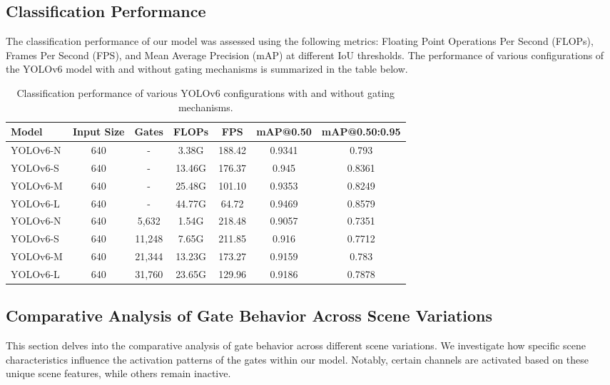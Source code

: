 \documentclass[runningheads]{llncs}
\begin{document}
\subsection{Classification Performance}
The classification performance of our model was assessed using the following metrics: Floating Point Operations Per Second (FLOPs), Frames Per Second (FPS), and Mean Average Precision (mAP) at different IoU thresholds. The performance of various configurations of the YOLOv6 model with and without gating mechanisms is summarized in the table below.

\begin{table}[ht]
\centering
\begin{tabular}{lcccccc}
\hline
\textbf{Model} & \textbf{Input Size} & \textbf{Gates} & \textbf{FLOPs} & \textbf{FPS} & \textbf{mAP@0.50} & \textbf{mAP@0.50:0.95} \\
\hline
YOLOv6-N & 640 & - & 3.38G & 188.42 & 0.9341 & 0.793 \\
YOLOv6-S & 640 & - & 13.46G & 176.37 & 0.945 & 0.8361 \\
YOLOv6-M & 640 & - & 25.48G & 101.10 & 0.9353 & 0.8249 \\
YOLOv6-L & 640 & - & 44.77G & 64.72 & 0.9469 & 0.8579 \\
YOLOv6-N & 640 & 5,632 & 1.54G & 218.48 & 0.9057 & 0.7351 \\
YOLOv6-S & 640 & 11,248 & 7.65G & 211.85 & 0.916 & 0.7712 \\
YOLOv6-M & 640 & 21,344 & 13.23G & 173.27 & 0.9159 & 0.783 \\
YOLOv6-L & 640 & 31,760 & 23.65G & 129.96 & 0.9186 & 0.7878 \\
\hline
\end{tabular}
\caption{Classification performance of various YOLOv6 configurations with and without gating mechanisms.}
\label{table:classification_performance}
\end{table}

\subsection{Comparative Analysis of Gate Behavior Across Scene Variations}

This section delves into the comparative analysis of gate behavior across different scene variations. We investigate how specific scene characteristics influence the activation patterns of the gates within our model. Notably, certain channels are activated based on these unique scene features, while others remain inactive.
\end{document}
